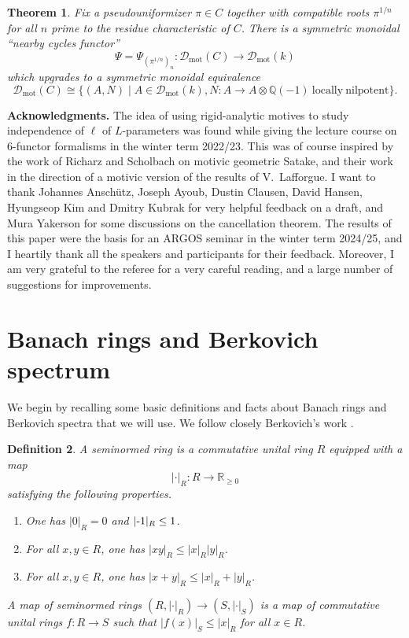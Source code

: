\documentclass[11pt]{amsart}
\numberwithin{equation}{section}
\newtheorem{theorem}{Theorem}
\numberwithin{theorem}{section}
\newtheorem{definition}[theorem]{Definition}
\theoremstyle{definition}
\begin{document}
\begin{theorem} Fix a pseudouniformizer $\pi\in C$ together with compatible roots $\pi^{1/n}$ for all $n$ prime to the residue characteristic of $C$. There is a symmetric monoidal ``nearby cycles functor''
\[
\Psi = \Psi_{(\pi^{1/n})_n}: \mathcal D_{\mathrm{mot}}(C)\to \mathcal D_{\mathrm{mot}}(k)
\]
which upgrades to a symmetric monoidal equivalence
\[
\mathcal D_{\mathrm{mot}}(C)\cong \{(A,N)\mid A\in \mathcal D_{\mathrm{mot}}(k), N: A\to A\otimes \mathbb Q(-1)\ \mathrm{locally}\ \mathrm{nilpotent}\}.
\]
\end{theorem}

{\bf Acknowledgments.} The idea of using rigid-analytic motives to study independence of $\ell$ of $L$-parameters was found while giving the lecture course on $6$-functor formalisms in the winter term 2022/23. This was of course inspired by the work of Richarz and Scholbach on motivic geometric Satake, and their work in the direction of a motivic version of the results of V.~Lafforgue. I want to thank Johannes Ansch\"utz, Joseph Ayoub, Dustin Clausen, David Hansen, Hyungseop Kim and Dmitry Kubrak for very helpful feedback on a draft, and Mura Yakerson for some discussions on the cancellation theorem. The results of this paper were the basis for an ARGOS seminar in the winter term 2024/25, and I heartily thank all the speakers and participants for their feedback. Moreover, I am very grateful to the referee for a very careful reading, and a large number of suggestions for improvements.

\section{Banach rings and Berkovich spectrum}

We begin by recalling some basic definitions and facts about Banach rings and Berkovich spectra that we will use. We follow closely Berkovich's work \cite[Chapter 1]{Berkovich}.

\begin{definition} A seminormed ring is a commutative unital ring $R$ equipped with a map
\[
|\cdot|_R: R\to \mathbb R_{\geq 0}
\]
satisfying the following properties.
\begin{enumerate}
\item[{\rm (i)}] One has $|0|_R=0$ and $|\text-1|_R\leq 1$.
\item[{\rm (ii)}] For all $x,y\in R$, one has $|xy|_R\leq |x|_R |y|_R$.
\item[{\rm (iii)}] For all $x,y\in R$, one has $|x+y|_R\leq |x|_R+|y|_R$.
\end{enumerate}

A map of seminormed rings $(R,|\cdot|_R)\to (S,|\cdot|_S)$ is a map of commutative unital rings $f: R\to S$ such that $|f(x)|_S\leq |x|_R$ for all $x\in R$.
\end{definition}
\end{document}
